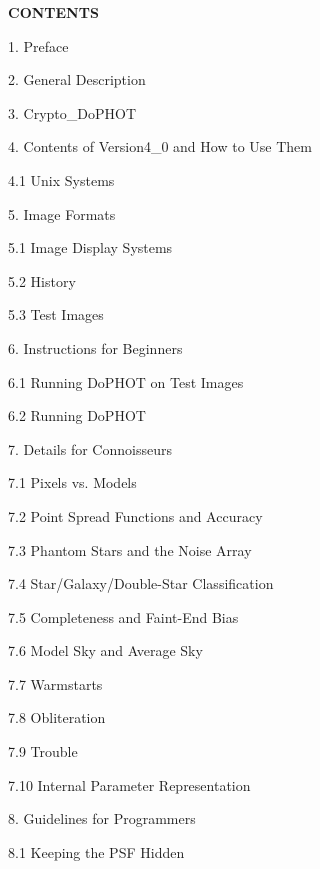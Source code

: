 \centerline {\bf CONTENTS}

\item{1.} Preface
\item{2.} General Description
\item{3.} Crypto\_DoPHOT
\item{4.} Contents of Version4\_0 and How to Use Them
\item\item{4.1} Unix Systems
\item{5.} Image Formats
\item\item{5.1} Image Display Systems
\item\item{5.2} History
\item\item{5.3} Test Images
\item{6.} Instructions for Beginners
\item\item{6.1} Running DoPHOT on Test Images
\item\item{6.2} Running DoPHOT
\item{7.} Details for Connoisseurs
\item\item{7.1} Pixels vs. Models
\item\item{7.2} Point Spread Functions and Accuracy
\item\item{7.3} Phantom Stars and the Noise Array
\item\item{7.4} Star/Galaxy/Double-Star Classification
\item\item{7.5} Completeness and Faint-End Bias
\item\item{7.6} Model Sky and Average Sky
\item\item{7.7} Warmstarts
\item\item{7.8} Obliteration
\item\item{7.9} Trouble
\item\item{7.10} Internal Parameter Representation
\item{8.} Guidelines for Programmers
\item\item{8.1} Keeping the PSF Hidden
